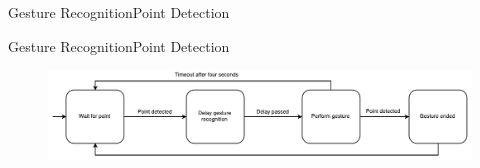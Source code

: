 \begin{frame}{Gesture Recognition}{Point Detection}
\begin{figure}
\end{figure}
\end{frame}

\begin{frame}{Gesture Recognition}{Point Detection}
\centering
\begin{figure}
    \includegraphics[width=\textwidth]{../images/point-to-gesture-state-diagram}
\label{fig:point-to-gesture-state-diagram}
\end{figure}
\end{frame}